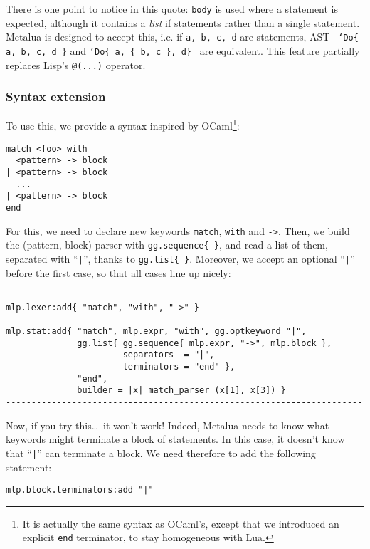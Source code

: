 There is one point to notice in this quote: \verb|body| is used where
a statement is expected, although it contains a {\em list} if
statements rather than a single statement. Metalua is designed to
accept this, i.e. if {\tt a, b, c, d} are statements, AST {\tt
`Do\{  a, b, c, d \}} and {\tt`Do\{ a, \{ b, c \}, d\} } are
equivalent. This feature partially replaces Lisp's \verb|@(...)|
operator.

\subsubsection{Syntax extension}
To use this, we provide a syntax inspired by OCaml\footnote{It is
  actually the same syntax as OCaml's, except that we introduced an
  explicit {\tt end} terminator, to stay homogeneous with Lua.}: 

\begin{verbatim}
match <foo> with
  <pattern> -> block
| <pattern> -> block
  ...
| <pattern> -> block
end
\end{verbatim}

For this, we need to declare new keywords \verb|match|,
\verb|with| and \verb|->|. Then, we build the (pattern, block) parser
with \verb|gg.sequence{ }|, and read a list of them, separated with
``\verb+|+'', thanks to \verb|gg.list{ }|. Moreover, we accept an
optional ``\verb+|+'' before the first case, so that all cases line up
nicely:

\begin{verbatim}
----------------------------------------------------------------------
mlp.lexer:add{ "match", "with", "->" }

mlp.stat:add{ "match", mlp.expr, "with", gg.optkeyword "|",
              gg.list{ gg.sequence{ mlp.expr, "->", mlp.block },
                       separators  = "|",
                       terminators = "end" },
              "end",
              builder = |x| match_parser (x[1], x[3]) }
----------------------------------------------------------------------
\end{verbatim}

\noindent Now, if you try this\ldots\ it won't work! Indeed, Metalua
needs to know what keywords might terminate a block of statements. In
this case, it doesn't know that ``\verb+|+'' can terminate a block. We
need therefore to add the following statement:

\begin{verbatim}
mlp.block.terminators:add "|"
\end{verbatim}

